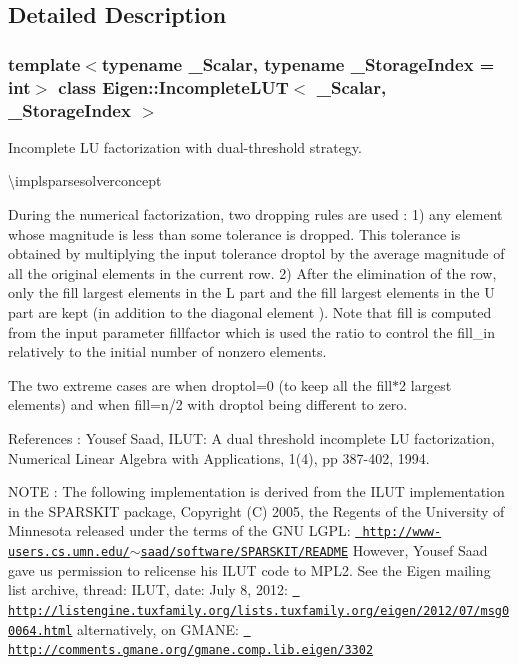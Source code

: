 \subsection{Detailed Description}
\subsubsection*{template$<$typename \+\_\+\+Scalar, typename \+\_\+\+Storage\+Index = int$>$\newline
class Eigen\+::\+Incomplete\+L\+U\+T$<$ \+\_\+\+Scalar, \+\_\+\+Storage\+Index $>$}

Incomplete LU factorization with dual-\/threshold strategy. 

\textbackslash{}implsparsesolverconcept

During the numerical factorization, two dropping rules are used \+: 1) any element whose magnitude is less than some tolerance is dropped. This tolerance is obtained by multiplying the input tolerance {\ttfamily droptol} by the average magnitude of all the original elements in the current row. 2) After the elimination of the row, only the {\ttfamily fill} largest elements in the L part and the {\ttfamily fill} largest elements in the U part are kept (in addition to the diagonal element ). Note that {\ttfamily fill} is computed from the input parameter {\ttfamily fillfactor} which is used the ratio to control the fill\+\_\+in relatively to the initial number of nonzero elements.

The two extreme cases are when {\ttfamily droptol=0} (to keep all the {\ttfamily fill$\ast$2} largest elements) and when {\ttfamily fill=n/2} with {\ttfamily droptol} being different to zero.

References \+: Yousef Saad, I\+L\+UT\+: A dual threshold incomplete LU factorization, Numerical Linear Algebra with Applications, 1(4), pp 387-\/402, 1994.

N\+O\+TE \+: The following implementation is derived from the I\+L\+UT implementation in the S\+P\+A\+R\+S\+K\+IT package, Copyright (C) 2005, the Regents of the University of Minnesota released under the terms of the G\+NU L\+G\+PL\+: \href{http://www-users.cs.umn.edu/~saad/software/SPARSKIT/README}{\texttt{ http\+://www-\/users.\+cs.\+umn.\+edu/$\sim$saad/software/\+S\+P\+A\+R\+S\+K\+I\+T/\+R\+E\+A\+D\+ME}} However, Yousef Saad gave us permission to relicense his I\+L\+UT code to M\+P\+L2. See the Eigen mailing list archive, thread\+: I\+L\+UT, date\+: July 8, 2012\+: \href{http://listengine.tuxfamily.org/lists.tuxfamily.org/eigen/2012/07/msg00064.html}{\texttt{ http\+://listengine.\+tuxfamily.\+org/lists.\+tuxfamily.\+org/eigen/2012/07/msg00064.\+html}} alternatively, on G\+M\+A\+NE\+: \href{http://comments.gmane.org/gmane.comp.lib.eigen/3302}{\texttt{ http\+://comments.\+gmane.\+org/gmane.\+comp.\+lib.\+eigen/3302}} 

